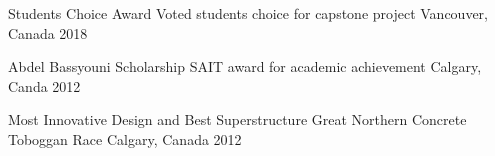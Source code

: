 
\begin{cvhonors}

  \cvhonor
    {Students Choice Award} %
    {Voted students choice for capstone project} %
    {Vancouver, Canada} %
    {2018} %

  \cvhonor
    {Abdel Bassyouni Scholarship} %
    {SAIT award for academic achievement} %
    {Calgary, Canda} %
    {2012} %

  \cvhonor
    {Most Innovative Design and Best Superstructure} %
    {Great Northern Concrete Toboggan Race} %
    {Calgary, Canada} %
    {2012} %

\end{cvhonors}
